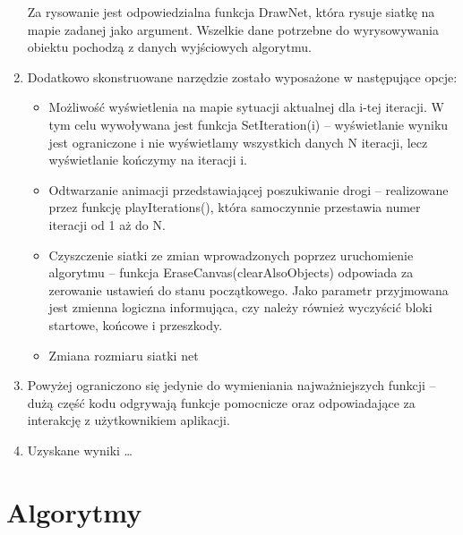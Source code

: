 \documentclass{article}
\begin{document}
\begin{enumerate}
Za rysowanie jest odpowiedzialna funkcja DrawNet, która rysuje siatkę na mapie zadanej jako argument. Wszelkie dane potrzebne do wyrysowywania obiektu pochodzą z danych wyjściowych algorytmu. 
	\item Dodatkowo skonstruowane narzędzie zostało wyposażone w następujące opcje:
	\begin{itemize}
			\item Możliwość wyświetlenia na mapie sytuacji aktualnej dla i-tej iteracji. W tym celu wywoływana jest funkcja SetIteration(i) – wyświetlanie wyniku jest ograniczone i nie wyświetlamy wszystkich danych N iteracji, lecz wyświetlanie kończymy na iteracji i.
   			\item Odtwarzanie animacji przedstawiającej poszukiwanie drogi – realizowane przez funkcję playIterations(), która samoczynnie przestawia numer iteracji od 1 aż do N.
			\item Czyszczenie siatki ze zmian wprowadzonych poprzez uruchomienie algorytmu – funkcja EraseCanvas(clearAlsoObjects) odpowiada za zerowanie ustawień do stanu początkowego. Jako parametr przyjmowana jest zmienna logiczna informująca, czy należy również wyczyścić bloki startowe, końcowe i przeszkody. 
			\item Zmiana rozmiaru siatki net
	\end{itemize}
	\item Powyżej ograniczono się jedynie do wymieniania najważniejszych funkcji – dużą część kodu odgrywają funkcje pomocnicze oraz odpowiadające za interakcję z użytkownikiem aplikacji. 
	\item Uzyskane wyniki …
\end{enumerate}


\newpage

\section{Algorytmy}
\end{document}
